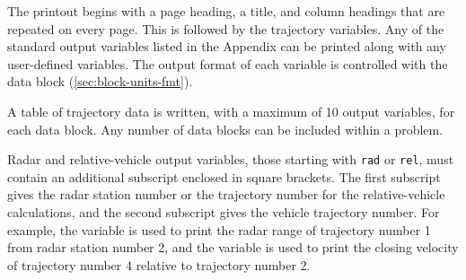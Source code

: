 The printout begins with a page heading, a title, and column headings that are
repeated on every page. This is followed by the trajectory variables. Any of the
standard output variables listed in the Appendix can be printed along with any
user-defined variables. The output format of each variable is controlled with the
 data block (\cref{sec:block-units-fmt}).

A table of trajectory data is written, with a maximum of 10 output variables, for each
 data block. Any number of  data
blocks can be included within a problem.

Radar and relative-vehicle output variables, those starting with \texttt{rad} or
\texttt{rel}, must contain an additional subscript enclosed in square brackets. The
first subscript gives the radar station number or the trajectory number for the
relative-vehicle calculations, and the second subscript gives the vehicle trajectory
number. For example, the variable  is used to print the radar
range of trajectory number 1 from radar station number 2, and the variable
 is used to print the closing velocity of trajectory number 4
relative to trajectory number 2.
